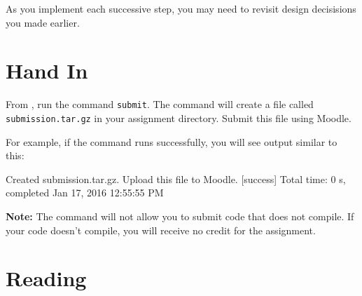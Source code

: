 \documentclass{book}
\begin{document}
\begin{enumerate}
\quad
{}
\quad
{}

\end{enumerate}

As you implement each successive step, you may need to revisit design
decisisions you made earlier.

\section{Hand In}

From \sbt{}, run the command \verb|submit|. The command will create
a file called \verb|submission.tar.gz| in your assignment directory.
Submit this file using Moodle.

For example, if the command runs successfully, you will see output similar
to this:
%
\begin{console}
Created submission.tar.gz. Upload this file to Moodle.
[success] Total time: 0 s, completed Jan 17, 2016 12:55:55 PM
\end{console}

\textbf{Note:}  The command will not allow you to submit code that does not
compile. If your code doesn't compile, you will receive no credit for the
assignment.

\newlecture

\section{Reading}
\end{document}
